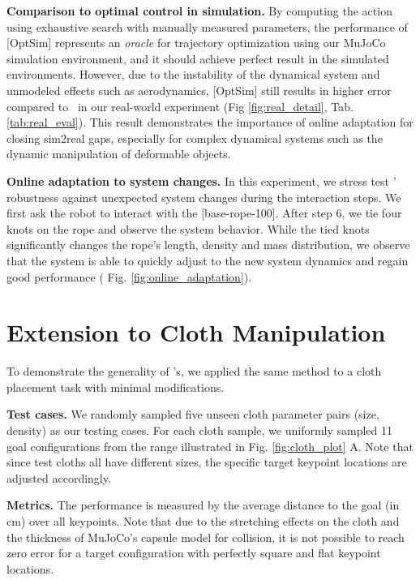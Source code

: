 \textbf{Comparison to optimal control in simulation.}
By computing the action using exhaustive search with manually measured parameters, the performance of [OptSim] represents an \textit{oracle} for trajectory optimization using our MuJoCo simulation environment, and it should achieve perfect result in the simulated environments.  
However, due to the instability of the dynamical system and unmodeled effects such as aerodynamics, [OptSim] still results in higher error compared to \names~in our real-world experiment (Fig \ref{fig:real_detail}, Tab. \ref{tab:real_eval}). 
This result demonstrates the importance of online adaptation for closing sim2real gaps, especially for complex dynamical systems such as the dynamic manipulation of deformable objects.

\textbf{Online adaptation to system changes.}
In this experiment, we stress test \names' robustness against unexpected system changes during the interaction steps. We first ask the robot to interact with the [base-rope-100]. After step 6, we tie four knots on the rope and observe the system behavior.  While the tied knots significantly changes the rope's length, density and mass distribution, we observe that the system is able to quickly adjust to the new system dynamics and regain good performance ( Fig. \ref{fig:online_adaptation}). 


\section{Extension to Cloth Manipulation}
\label{sec:cloth_eval}
To demonstrate the generality of \names's, we applied the same method to a cloth placement task with minimal modifications.

\textbf{Test cases.}
We randomly sampled five unseen cloth parameter pairs (size, density) as our testing cases. For each cloth sample, we uniformly sampled 11 goal configurations from the range illustrated in Fig. \ref{fig:cloth_plot} A. Note that since test cloths all have different sizes, the specific target keypoint locations are adjusted accordingly. 

\textbf{Metrics.}
The performance is measured by the average distance to the goal (in cm) over all keypoints. Note that due to the stretching effects on the cloth and the thickness of MuJoCo's capsule model for collision, it is not possible to reach zero error for a target configuration with perfectly square and flat keypoint locations.

